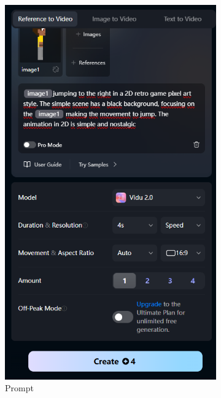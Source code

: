 \begin{figure}[htbp]
    \centering
    \caption{\small Processo de geração da animação de pulo pela funcionalidade Referência para vídeo no Vidu}
    \label{fig:viduPulo1}
    \begin{subfigure}{0.55\linewidth}
        \includegraphics[width=1\linewidth]{figs/vidu/PULO_tela01.PNG}
        \caption{\small Prompt}
        \label{fig:viduPulo1a}
    \end{subfigure}
    \begin{subfigure}{0.45\linewidth}

\end{subfigure}
\end{figure}
